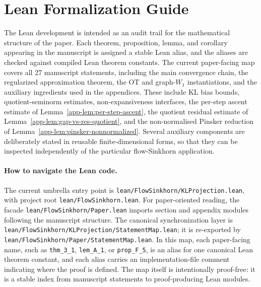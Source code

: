 \documentclass{article}
\theoremstyle{plain}
\begin{document}


\section{Lean Formalization Guide}
\label{app-sec:lean-formalization}

The Lean development is intended as an audit trail for the mathematical structure of the paper.  Each theorem, proposition, lemma, and corollary appearing in the manuscript is assigned a stable Lean alias, and the aliases are checked against compiled Lean theorem constants.  The current paper-facing map covers all 27 manuscript statements, including the main convergence chain, the regularized approximation theorem, the OT and graph-$W_1$ instantiations, and the auxiliary ingredients used in the appendices.  These include KL bias bounds, quotient-seminorm estimates, non-expansiveness interfaces, the per-step ascent estimate of Lemma~\ref{app-lem:per-step-ascent}, the quotient residual estimate of Lemma~\ref{app-lem:gap-vs-res-quotient}, and the non-normalised Pinsker reduction of Lemma~\ref{app-lem:pinsker-nonnormalized}.  Several auxiliary components are deliberately stated in reusable finite-dimensional forms, so that they can be inspected independently of the particular flow-Sinkhorn application.

\paragraph{How to navigate the Lean code.}
The current umbrella entry point is \texttt{lean/\allowbreak FlowSinkhorn/\allowbreak KLProjection.lean}, with project root \texttt{lean/\allowbreak FlowSinkhorn.lean}.  For paper-oriented reading, the facade \texttt{lean/\allowbreak FlowSinkhorn/\allowbreak Paper.lean} imports section and appendix modules following the manuscript structure.  The canonical synchronization layer is \texttt{lean/\allowbreak FlowSinkhorn/\allowbreak KLProjection/\allowbreak StatementMap.lean}; it is re-exported by \texttt{lean/\allowbreak FlowSinkhorn/\allowbreak Paper/\allowbreak StatementMap.lean}.  In this map, each paper-facing name, such as \texttt{thm\_3\_1}, \texttt{lem\_A\_1}, or \texttt{prop\_F\_5}, is an alias for one canonical Lean theorem constant, and each alias carries an implementation-file comment indicating where the proof is defined.  The map itself is intentionally proof-free: it is a stable index from manuscript statements to proof-producing Lean modules.
\end{document}
